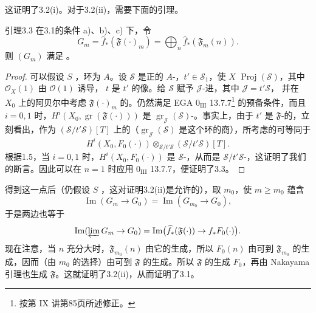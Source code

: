 这证明了3.2(i)。对于3.2(ii)，需要下面的引理。
\begin{SGAresult}{引理}{3.3}
在3.1的条件 a)、b)、c) 下，令
\[
 G_m=\widehat f_*(\mathfrak F(\cdot)_m)=\bigoplus_n\widehat f_*(\mathfrak F_m(n)).
\]
则 $(G_m)$ 满足 。
\end{SGAresult}
\begin{proof}
可以假设 $S$ ，环为 $A$。设 $\mathscr S$ 是正的 $A$-，$t'\in\mathscr S_1$，使 $X$  $\operatorname{Proj}(\mathscr S)$，其中 $\mathcal O_X(1)$ 由 $\mathcal O(1)$ 诱导， $t$ 是 $t'$ 的像。给 $\mathscr S$ 赋予 $\mathcal J$-进，其中 $\mathcal J=t'\mathscr S$，
并在 $X_0$ 上的阿贝尔中考虑 $\mathfrak F(\cdot)_m$ 的。仍然满足 EGA $0_{\mathrm{III}}$ 13.7.7\footnote{按第 IX 讲第85页所述修正。} 的预备条件，而且 $i=0,1$ 时，$H^i(X_0,\operatorname{gr}(\mathfrak F(\cdot)))$ 是 $\operatorname{gr}_{\mathcal J}(\mathscr S)$-。事实上，由于 $t'$ 是 $\mathfrak F$-的，立刻看出，作为 $(\mathscr S/t'\mathscr S)[T]$ 上的（$\operatorname{gr}_{\mathcal J}(\mathscr S)$ 是这个环的商），所考虑的可等同于
\[
 H^i(X_0,F_0(\cdot))\otimes_{\mathscr S/t'\mathscr S}(\mathscr S/t'\mathscr S)[T].
\]
根据1.5，当 $i=0,1$ 时，$H^i(X_0,F_0(\cdot))$ 是 $\mathscr S$-，从而是 $\mathscr S/t'\mathscr S$-，这证明了我们的断言。因此可以在 $n=1$ 时应用 $0_{\mathrm{III}}$ 13.7.7，便证明了3.3。
\end{proof}
得到这一点后（仍假设 $S$ ，这对证明3.2(ii)是允许的），取 $m_0$，使 $m\geq m_0$ 蕴含
\[
 \operatorname{Im}(G_m\to G_0)=\operatorname{Im}(G_{m_0}\to G_0),
\]
于是两边也等于
\[
 \operatorname{Im}(\varprojlim G_m\to G_0)
 =\operatorname{Im}\bigl(\widehat f_*(\mathfrak F(\cdot))\to f_*F_0(\cdot)\bigr).
\]
现在注意，当 $n$ 充分大时，$\mathfrak F_{m_0}(n)$ 由它的生成，所以 $F_0(n)$ 由可到 $\mathfrak F_{m_0}$ 的生成，因而（由 $m_0$ 的选择）由可到 $\mathfrak F$ 的生成。所以 $\mathfrak F$ 的生成 $F_0$，再由 Nakayama 引理也生成 $\mathfrak F$。这就证明了3.2(ii)，从而证明了3.1。
